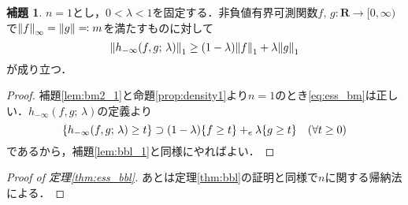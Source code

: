 \documentclass[a4j]{ltjsarticle}
\newcommand{\Rset}{\mathbf{R}}
\newcommand{\1}{\bm{1}}
\numberwithin{equation}{section}
\theoremstyle{definition}
\newtheorem{lem}[thm]{補題}
\begin{document}
\begin{lem}\label{lem:ess_bbl_1}
    $n=1$とし，$0<\lambda<1$を固定する．非負値有界可測関数$f,\,g\colon\Rset\to[0,\infty)$で$\norm{f}_{\infty}=\norm{g}\eqqcolon m$を満たすものに対して
    \begin{equation}
        \norm{h_{-\infty}(f,g;\,\lambda)}_{1}\geq (1-\lambda)\norm{f}_1+\lambda \norm{g}_{1}
    \end{equation}
    が成り立つ．
\end{lem}
\begin{proof}
    補題\ref{lem:bm2_1}と命題\ref{prop:density1}より$n=1$のとき\eqref{eq:ess_bm}は正しい．$h_{-\infty}(f,g;\,\lambda)$の定義より
    \begin{equation}
        \qty{h_{-\infty}(f,g;\,\lambda)\geq t}\supset (1-\lambda)\qty{f\geq t}+_e \lambda\qty{g\geq t}\quad (\forall t\geq0)
    \end{equation}
    であるから，補題\ref{lem:bbl_1}と同様にやればよい．
\end{proof}
\begin{proof}[Proof of \textup{定理\ref{thm:ess_bbl}}]
    あとは定理\ref{thm:bbl}の証明と同様で$n$に関する帰納法による．
\end{proof}
\end{document}
